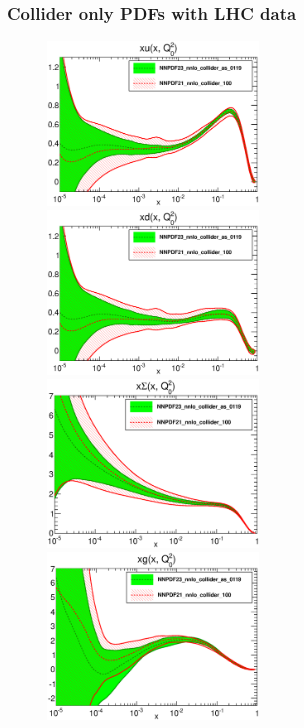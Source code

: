 \documentclass[10pt]{beamer}
\begin{document}
\begin{frame}
\frametitle{Collider only PDFs with LHC data}
 \begin{figure}[b!]
    \begin{center}
      \includegraphics[width=0.50\textwidth]{pdf_xu_log_band_comparison.eps}
      \includegraphics[width=0.50\textwidth]{pdf_xd_log_band_comparison.eps} \\
      \includegraphics[width=0.50\textwidth]{pdf_xSigma_log_band_comparison.eps}
      \includegraphics[width=0.50\textwidth]{pdf_xg_log_band_comparison.eps}
    \end{center}
    \vskip-0.5cm
    \label{fig:pdf-jets}
\end{figure}

\end{frame}
\end{document}
